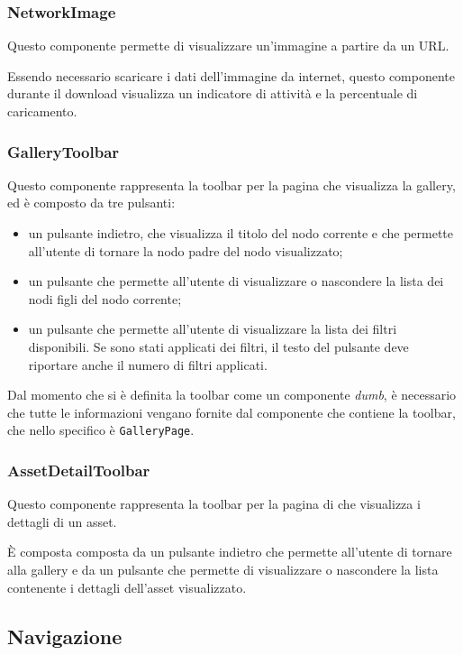 \subsubsection{NetworkImage}

Questo componente permette di visualizzare un'immagine a partire da un URL.

Essendo necessario scaricare i dati dell'immagine da internet, questo componente durante il download visualizza un indicatore di attività e la percentuale di caricamento.

\subsubsection{GalleryToolbar}

Questo componente rappresenta la toolbar per la pagina che visualizza la gallery, ed è composto da tre pulsanti:
\begin{itemize}
\item un pulsante indietro, che visualizza il titolo del nodo corrente e che permette all'utente di tornare la nodo padre del nodo visualizzato;
\item un pulsante che permette all'utente di visualizzare o nascondere la lista dei nodi figli del nodo corrente;
\item un pulsante che permette all'utente di visualizzare la lista dei filtri disponibili. Se sono stati applicati dei filtri, il testo del pulsante deve riportare anche il numero di filtri applicati.
\end{itemize}

Dal momento che si è definita la toolbar come un componente \textit{dumb}, è necessario che tutte le informazioni vengano fornite dal componente che contiene la toolbar, che nello specifico è \texttt{GalleryPage}.

\subsubsection{AssetDetailToolbar}

Questo componente rappresenta la toolbar per la pagina di che visualizza i dettagli di un asset.

\`E composta composta da un pulsante indietro che permette all'utente di tornare alla gallery e da un pulsante che permette di visualizzare o nascondere la lista contenente i dettagli dell'asset visualizzato.

\subsection{Navigazione}


